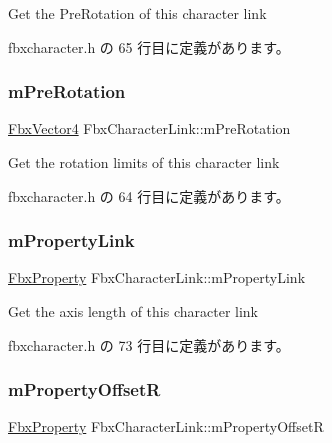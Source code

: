 Get the Pre\+Rotation of this character link 



 fbxcharacter.\+h の 65 行目に定義があります。

\mbox{\label{class_fbx_character_link_ad72d5286a98d4e83b71bb2c53885d6ce}} 
\subsubsection{\texorpdfstring{m\+Pre\+Rotation}{mPreRotation}}
{\footnotesize\ttfamily \hyperlink{class_fbx_vector4}{Fbx\+Vector4} Fbx\+Character\+Link\+::m\+Pre\+Rotation}



Get the rotation limits of this character link 



 fbxcharacter.\+h の 64 行目に定義があります。

\mbox{\label{class_fbx_character_link_aa0e1f2f48f9da2baca38191023b55e10}} 
\subsubsection{\texorpdfstring{m\+Property\+Link}{mPropertyLink}}
{\footnotesize\ttfamily \hyperlink{class_fbx_property}{Fbx\+Property} Fbx\+Character\+Link\+::m\+Property\+Link}



Get the axis length of this character link 



 fbxcharacter.\+h の 73 行目に定義があります。

\mbox{\label{class_fbx_character_link_a9fb8ef5de919ec31a796862a4ed03887}} 
\subsubsection{\texorpdfstring{m\+Property\+OffsetR}{mPropertyOffsetR}}
{\footnotesize\ttfamily \hyperlink{class_fbx_property}{Fbx\+Property} Fbx\+Character\+Link\+::m\+Property\+OffsetR}



